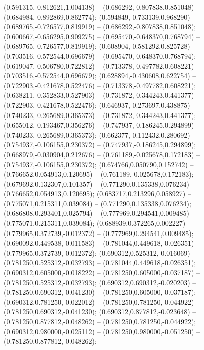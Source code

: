  (0.591315,-0.812621,1.004138) -- (0.686292,-0.807838,0.851048) -- (0.684984,-0.892869,0.862774);
 (0.594849,-0.733139,0.968290) -- (0.689765,-0.726577,0.819919) -- (0.686292,-0.807838,0.851048);
 (0.600667,-0.656295,0.909275) -- (0.695470,-0.648370,0.768794) -- (0.689765,-0.726577,0.819919);
 (0.608904,-0.581292,0.825728) -- (0.703516,-0.572544,0.696679) -- (0.695470,-0.648370,0.768794);
 (0.619047,-0.506780,0.722812) -- (0.713378,-0.497782,0.608221) -- (0.703516,-0.572544,0.696679);
 (0.628894,-0.430608,0.622754) -- (0.722903,-0.421678,0.522476) -- (0.713378,-0.497782,0.608221);
 (0.638211,-0.352833,0.527903) -- (0.731872,-0.344243,0.441377) -- (0.722903,-0.421678,0.522476);
 (0.646937,-0.273697,0.438875) -- (0.740233,-0.265689,0.365373) -- (0.731872,-0.344243,0.441377);
 (0.655012,-0.193467,0.356276) -- (0.747937,-0.186245,0.294899) -- (0.740233,-0.265689,0.365373);
 (0.662377,-0.112432,0.280692) -- (0.754937,-0.106155,0.230372) -- (0.747937,-0.186245,0.294899);
 (0.668979,-0.030904,0.212676) -- (0.761189,-0.025678,0.172183) -- (0.754937,-0.106155,0.230372);
 (0.674766,0.050790,0.152742) -- (0.766652,0.054913,0.120695) -- (0.761189,-0.025678,0.172183);
 (0.679692,0.132307,0.101357) -- (0.771290,0.135338,0.076234) -- (0.766652,0.054913,0.120695);
 (0.683717,0.213296,0.058927) -- (0.775071,0.215311,0.039084) -- (0.771290,0.135338,0.076234);
 (0.686808,0.293401,0.025794) -- (0.777969,0.294541,0.009485) -- (0.775071,0.215311,0.039084);
 (0.688939,0.372265,0.002227) -- (0.779965,0.372739,-0.012372) -- (0.777969,0.294541,0.009485);
 (0.690092,0.449538,-0.011583) -- (0.781044,0.449618,-0.026351) -- (0.779965,0.372739,-0.012372);
 (0.690312,0.525312,-0.016069) -- (0.781250,0.525312,-0.032793) -- (0.781044,0.449618,-0.026351);
 (0.690312,0.605000,-0.018222) -- (0.781250,0.605000,-0.037187) -- (0.781250,0.525312,-0.032793);
 (0.690312,0.690312,-0.020203) -- (0.781250,0.690312,-0.041230) -- (0.781250,0.605000,-0.037187);
 (0.690312,0.781250,-0.022012) -- (0.781250,0.781250,-0.044922) -- (0.781250,0.690312,-0.041230);
 (0.690312,0.877812,-0.023648) -- (0.781250,0.877812,-0.048262) -- (0.781250,0.781250,-0.044922);
 (0.690312,0.980000,-0.025112) -- (0.781250,0.980000,-0.051250) -- (0.781250,0.877812,-0.048262);
